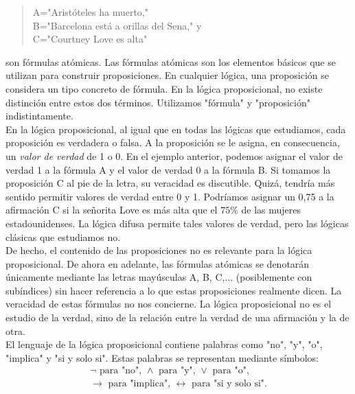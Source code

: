 \message{ !name(main.tex)}\documentclass[12pt,a4paper]{book}
\newcommand{\comillas}[1]{"#1"}
\begin{document}
    \begin{quote}
        A=\comillas{Aristóteles ha muerto,}\\
        B=\comillas{Barcelona está a orillas del Sena,} y\\
        C=\comillas{Courtney Love es alta}
    \end{quote}

    son fórmulas atómicas. Las fórmulas atómicas son los elementos básicos que se utilizan para construir
    proposiciones. En cualquier lógica, una proposición se considera un tipo concreto de fórmula. En la
    lógica proposicional, no existe distinción entre estos dos términos. Utilizamos \comillas{fórmula} y
    \comillas{proposición} indistintamente.\\
    En la lógica proposicional, al igual que en todas las lógicas que estudiamos, cada proposición es verdadera
    o falsa. A la proposición se le asigna, en consecuencia, un \textit{valor de verdad} de 1 o 0. En el ejemplo anterior, podemos
    asignar el valor de verdad 1 a la fórmula A y el valor de verdad 0 a la fórmula B. Si tomamos la proposición C al pie de la letra,
    su veracidad es discutible. Quizá, tendría más sentido permitir valores de verdad entre 0 y 1. Podríamos asignar un 0,75 a la afirmación C
    si la señorita Love es más alta que el $75\%$ de las mujeres estadounidenses. La lógica difusa permite tales valores de verdad,
    pero las lógicas clásicas que estudiamos no.\\
    De hecho, el contenido de las proposiciones no es relevante para la lógica proposicional. De ahora en adelante, las fórmulas
    atómicas se denotarán únicamente mediante las letras mayúsculas A, B, C,$\dots$ (posiblemente con subíndices) sin hacer referencia a lo
    que estas proposiciones realmente dicen. La veracidad de estas fórmulas no nos concierne. La lógica proposicional no es el estudio de la verdad,
    sino de la relación entre la verdad de una afirmación y la de otra.\\
    El lenguaje de la lógica proposicional contiene palabras como \comillas{no}, \comillas{y}, \comillas{o}, \comillas{implica} y
    \comillas{si y solo si}. Estas palabras se representan mediante símbolos:
    \begin{gather*}
        \neg\text{ para \comillas{no}, }\land\text{ para \comillas{y}, }\lor\text{ para \comillas{o},}\\
        \rightarrow\text{ para \comillas{implica}, }\leftrightarrow\text{ para \comillas{si y solo si}.}
    \end{gather*}
\end{document}
